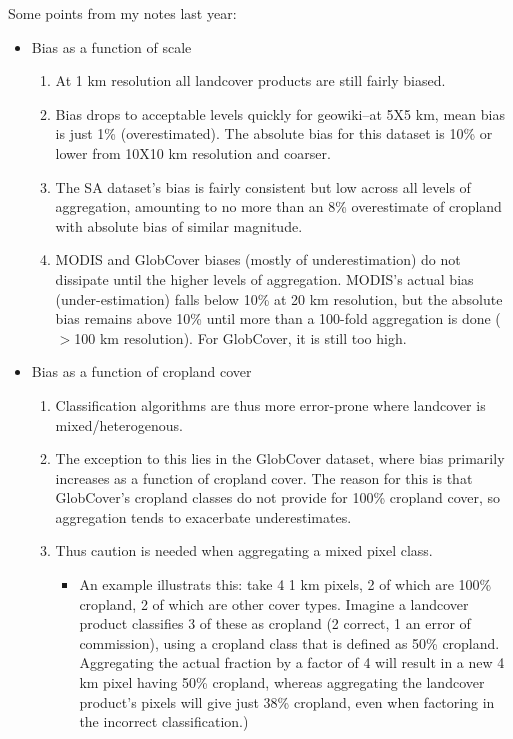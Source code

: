 \documentclass{pnastwo}
\begin{document}
\begin{article}
Some points from my notes last year: 
\begin{itemize}
  \item Bias as a function of scale
    \begin{enumerate}
      \item At 1 km resolution all landcover products are still fairly biased.  
       \item Bias drops to acceptable levels quickly for geowiki--at 5X5 km, mean bias is just 1\% (overestimated). The absolute bias for this dataset is 10\% or lower from 10X10 km resolution and coarser.  
       \item The SA dataset's bias is fairly consistent but low across all levels of aggregation, amounting to no more than an 8\% overestimate of cropland with absolute bias of similar magnitude. 
       \item MODIS and GlobCover biases (mostly of underestimation) do not dissipate until the higher levels of aggregation. MODIS's actual bias (under-estimation) falls below 10\% at 20 km resolution, but the absolute bias remains above 10\% until more than a 100-fold aggregation is done ($>$100 km resolution).  For GlobCover, it is still too high.  
    \end{enumerate}
  \item Bias as a function of cropland cover
    \begin{enumerate}
      \item Classification algorithms are thus more error-prone where landcover is mixed/heterogenous.
      \item The exception to this lies in the GlobCover dataset, where bias primarily increases as a function of cropland cover. The reason for this is that GlobCover's cropland classes do not provide for 100\% cropland cover, so aggregation tends to exacerbate underestimates. 
      \item Thus caution is needed when aggregating a mixed pixel class.  
        \begin{itemize} 
          \item An example illustrats this: take 4 1 km pixels, 2 of which are 100\% cropland, 2 of which are other cover types. Imagine a landcover product classifies 3 of these as cropland (2 correct, 1 an error of commission), using a cropland class that is defined as 50\% cropland. Aggregating the actual fraction by a factor of 4 will result in a new 4 km pixel having 50\% cropland, whereas aggregating the landcover product's pixels will give just 38\% cropland, even when factoring in the incorrect classification.)

\end{itemize}
\end{enumerate}
\end{itemize}
\end{article}
\end{document}
